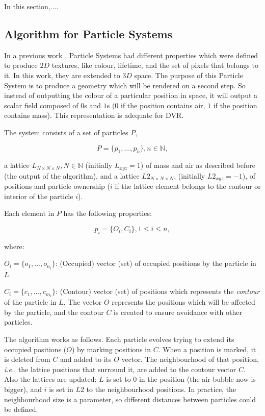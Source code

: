 \documentclass[oneside,a4paper,english,links]{amca}
\begin{document}
In this section,....

\subsection{Algorithm for Particle Systems}
In a previous work \citep{Baravalle2011}, Particle Systems had different properties which were defined to produce $2D$ textures, like colour, lifetime, and the set of pixels that belongs to it. In this work, they are extended to $3D$ space. The purpose of this Particle System is to produce a geometry which will be rendered on a second step. So instead of outputting the colour of a particular position in space, it will output a scalar field composed of $0$s and $1$s ($0$ if the position contains air, $1$ if the position contains mass). This representation is adequate for DVR. 

The system consists of a set of particles $P$, 

\begin{equation}
  P = \{p_{1}, ... , p_{n}\}, n  \in \mathbb{N},
\end{equation}

a lattice $L_{N\times N \times N}, N \in \mathbb{N} $ (initially $L_{xyz}=1$) of mass and air as described before (the output of the algorithm), and a lattice $L2_{N\times N \times N}$, (initially $L2_{xyz}=-1$), of positions and particle ownership ($i$ if the lattice element belongs to the contour or interior of the particle $i$).

Each element in $P$ has the following properties:

\begin{equation}
  p_{i} = \{O_{i}, C_{i}\}, 1 \le i \le n,
\end{equation}

where:

$O_{i} = \{o_{1}, ... , o_{n_{i}}\}$: (Occupied) vector (set) of occupied positions by the particle in $L$.

$C_{i} = \{c_{1}, ... , c_{m_{i}}\}$: (Contour) vector (set) of positions which represents the {\em contour} of the particle in $L$. The vector $O$ represents the positions which will be affected by the particle, and the contour $C$ is created to ensure avoidance with other particles.

The algorithm works as follows. Each particle evolves trying to extend its occupied positions ($O$) by marking positions in $C$. When a position is marked, it is deleted from $C$ and added to its $O$ vector. The neighbourhood of that position, {\em i.e.}, the lattice positions that surround it, are added to the contour vector $C$. Also the lattices are updated: $L$ is set to $0$ in the position (the air bubble now is bigger), and $i$ is set in $L2$ to the neighbourhood positions. In practice, the neighbourhood size is a parameter, so different distances between particles could be defined.
\end{document}
